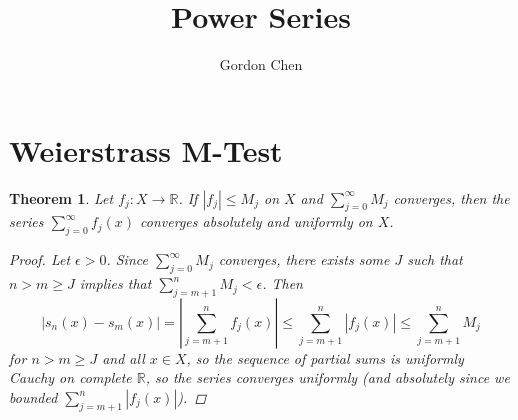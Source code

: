 \documentclass[12pt, letterpaper]{article}
\title{Power Series}
\author{Gordon Chen}
\date{}
\newtheorem{thm}{Theorem}[section]
\theoremstyle{definition}
\begin{document}
\maketitle

\section{Weierstrass M-Test}
\begin{thm}
  Let $f_j : X \to \mathbb{R}$.
  If $|f_j| \le M_j$ on $X$ and $\sum_{j=0}^\infty M_j$ converges,
  then the series $\sum_{j=0}^\infty f_j(x)$ converges absolutely and uniformly on $X$.

  \begin{proof}
    Let $\epsilon > 0$. Since $\sum_{j=0}^\infty M_j$ converges, there exists some $J$ such that
    $n > m \ge J$ implies that $\sum_{j=m+1}^n M_j < \epsilon$. Then 
    $$
    |s_n(x) - s_m(x)| = \left|\sum_{j=m+1}^n f_j(x) \right|
    \le \sum_{j=m+1}^n |f_j(x)| \le \sum_{j=m+1}^n M_j
    $$
    for $n > m \ge J$ and all $x \in X$, so the sequence of partial sums is uniformly Cauchy
    on complete $\mathbb{R}$, so the series converges uniformly
    (and absolutely since we bounded $\sum_{j=m+1}^n |f_j(x)|$).
  \end{proof}
\end{thm}
\end{document}
